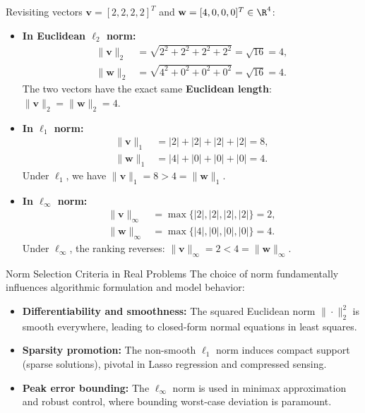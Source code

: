 Revisiting vectors $\mathbf{v} = [2, 2, 2, 2]^T$ and $\mathbf{w} = [4, 0, 0, 0]^T \in \R^4$:

\begin{example}
\mbox{}\par\nopagebreak
\begin{itemize}
    \item \textbf{In Euclidean $\ell_2$ norm:}
    \begin{align}
        \|\mathbf{v}\|_2 &= \sqrt{2^2 + 2^2 + 2^2 + 2^2} = \sqrt{16} = 4, \\
        \|\mathbf{w}\|_2 &= \sqrt{4^2 + 0^2 + 0^2 + 0^2} = \sqrt{16} = 4.
    \end{align}
    The two vectors have the exact same \textbf{Euclidean length}: $\|\mathbf{v}\|_2 = \|\mathbf{w}\|_2 = 4$.
    \item \textbf{In $\ell_1$ norm:}
    \begin{align}
        \|\mathbf{v}\|_1 &= |2| + |2| + |2| + |2| = 8, \\
        \|\mathbf{w}\|_1 &= |4| + |0| + |0| + |0| = 4.
    \end{align}
    Under $\ell_1$, we have $\|\mathbf{v}\|_1 = 8 > 4 = \|\mathbf{w}\|_1$.
    \item \textbf{In $\ell_\infty$ norm:}
    \begin{align}
        \|\mathbf{v}\|_\infty &= \max\{|2|, |2|, |2|, |2|\} = 2, \\
        \|\mathbf{w}\|_\infty &= \max\{|4|, |0|, |0|, |0|\} = 4.
    \end{align}
    Under $\ell_\infty$, the ranking reverses: $\|\mathbf{v}\|_\infty = 2 < 4 = \|\mathbf{w}\|_\infty$.
\end{itemize}
\end{example}

\begin{alertblock}{Norm Selection Criteria in Real Problems}
The choice of norm fundamentally influences algorithmic formulation and model behavior:
\begin{itemize}
    \item \textbf{Differentiability and smoothness:} The squared Euclidean norm $\|\cdot\|_2^2$ is smooth everywhere, leading to closed-form normal equations in least squares.
    \item \textbf{Sparsity promotion:} The non-smooth $\ell_1$ norm induces compact support (sparse solutions), pivotal in Lasso regression and compressed sensing.
    \item \textbf{Peak error bounding:} The $\ell_\infty$ norm is used in minimax approximation and robust control, where bounding worst-case deviation is paramount.
\end{itemize}
\end{alertblock}


